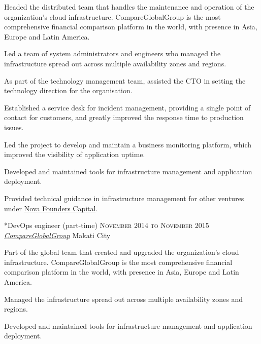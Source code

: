 \documentclass[10pt, a4paper, final]{article}
\begin{document}
\begin{section}
\begin{subsection}
    Headed the distributed team that handles the maintenance and operation of the organization's cloud infrastructure. CompareGlobalGroup is the most comprehensive financial comparison platform in the world, with presence in Asia, Europe and Latin America.
    \vspace{1em}
    \begin{compactitem}
      \item Led a team of system administrators and engineers who managed the infrastructure spread out across multiple availability zones and regions.
      \item As part of the technology management team, assisted the CTO in setting the technology direction for the organisation.
      \item Established a service desk for incident management, providing a single point of contact for customers, and greatly improved the response time to production issues.
      \item Led the project to develop and maintain a business monitoring platform, which improved the visibility of application uptime.
      \item Developed and maintained tools for infrastructure management and application deployment.
      \item Provided technical guidance in infrastructure management for other ventures under \href{http://www.novafounders.com/}{Nova Founders Capital}.
      
    \end{compactitem}
  \end{subsection}
  \vspace{2.5em}

  \begin{subsection}*{DevOps engineer (part-time) \hfill\textsc{November 2014 to November 2015}}
    \href{http://www.compareglobalgroup.com}{\textit{CompareGlobalGroup}} \hfill Makati City
    \vspace{1em}

    Part of the global team that created and upgraded the organization's cloud infrastructure. CompareGlobalGroup is the most comprehensive financial comparison platform in the world, with presence in Asia, Europe and Latin America.
    \vspace{1em}
    \begin{compactitem}
      \item Managed the infrastructure spread out across multiple availability zones and regions.
      \item Developed and maintained tools for infrastructure management and application deployment.
      

\end{compactitem}
\end{subsection}
\end{section}
\end{document}
